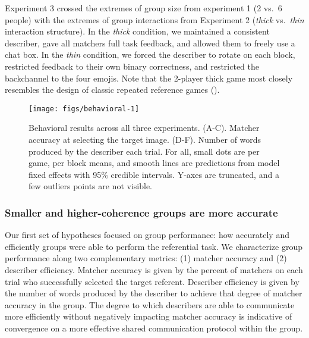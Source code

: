 \documentclass[
  english,
]{article}
\begin{document}
Experiment 3 crossed the extremes of group size from experiment 1 (2 vs.~6 people) with the extremes of group interactions from Experiment 2 (\emph{thick} vs.~\emph{thin} interaction structure).
In the \emph{thick} condition, we maintained a consistent describer, gave all matchers full task feedback, and allowed them to freely use a chat box.
In the \emph{thin} condition, we forced the describer to rotate on each block, restricted feedback to their own binary correctness, and restricted the backchannel to the four emojis.
Note that the 2-player thick game most closely resembles the design of classic repeated reference games ().

\begin{figure*}[t!]

{\centering \texttt{[image: figs/behavioral-1]} 

}

\caption{Behavioral results across all three experiments. (A-C). Matcher accuracy at selecting the target image. (D-F). Number of words produced by the describer each trial. For all, small dots are per game, per block means, and smooth lines are predictions from model fixed effects with 95\% credible intervals. Y-axes are truncated, and a few outliers points are not visible.}\label{fig:behavioral}
\end{figure*}

\subsubsection{Smaller and higher-coherence groups are more accurate}\label{smaller-and-higher-coherence-groups-are-more-accurate}

Our first set of hypotheses focused on group performance: how accurately and efficiently groups were able to perform the referential task.
We characterize group performance along two complementary metrics: (1) matcher accuracy and (2) describer efficiency.
Matcher accuracy is given by the percent of matchers on each trial who successfully selected the target referent.
Describer efficiency is given by the number of words produced by the describer to achieve that degree of matcher accuracy in the group.
The degree to which describers are able to communicate more efficiently without negatively impacting matcher accuracy is indicative of convergence on a more effective shared communication protocol within the group.
\end{document}
